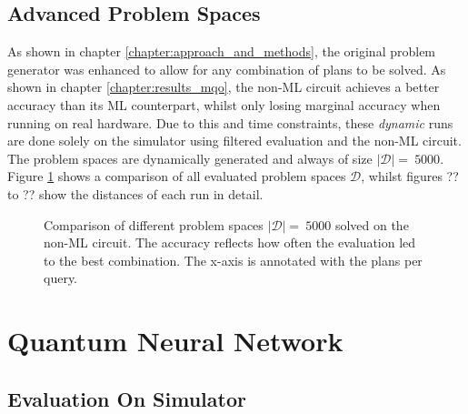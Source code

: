 \subsection{Advanced Problem Spaces}
\label{chapter:results_advanced_problem_spaces}
As shown in chapter \ref{chapter:approach_and_methods}, the original problem generator was enhanced to allow for any combination of plans to be solved. As shown in chapter \ref{chapter:results_mqo}, the non-ML circuit achieves a better accuracy than its ML counterpart, whilst only losing marginal accuracy when running on real hardware. Due to this and time constraints, these \emph{dynamic} runs are done solely on the simulator using filtered evaluation and the non-ML circuit. The problem spaces are dynamically generated and always of size $\left|\mathcal{D}\right| =\ 5000$. Figure \ref{figure:overview_dynamic_problems} shows a comparison of all evaluated problem spaces $\mathcal{D}$, whilst figures ?? to ?? show the distances of each run in detail.


\begin{figure}[!h]
    \centering
    \scalebox{\resultboxplot}{
        
    }
    \caption{Comparison of different problem spaces $\left|\mathcal{D}\right| =\ 5000$ solved on the non-ML circuit. The accuracy reflects how often the evaluation led to the best combination. The x-axis is annotated with the plans per query.}
    \label{figure:overview_dynamic_problems}
\end{figure}


\section{Quantum Neural Network}

\subsection{Evaluation On Simulator}

